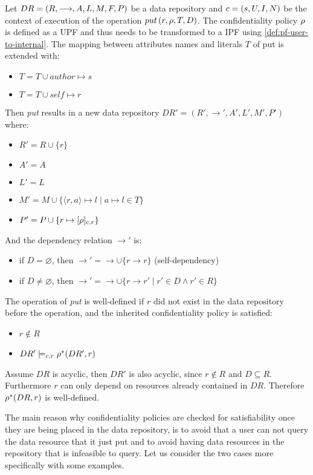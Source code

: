 \begin{definition}
Let $DR= \left( R, \longrightarrow, A, L, M, F, P \right)$ be a data repository and $c = \left( s, U, I, N \right)$ be the context of execution of the operation $put \left( r, \rho, T, D \right)$. The confidentiality policy $\rho$ is defined as a UPF and thus needs to be transformed to a IPF using \autoref{def:pf-user-to-internal}. The mapping between attributes names and literals $T$ of put is extended with: 
\begin{itemize}
    \item $T = T \cup author \mapsto s$
    \item $T = T \cup self \mapsto r$
\end{itemize}
Then \emph{put} results in a new data repository $DR'=\left(R', \longrightarrow', A', L', M', P' \right)$ where:
\begin{itemize}
    \item $R' = R \cup \{r\}$
    \item $A' = A$
    \item $L' = L$
    \item $M' = M \cup \{ \langle r,a \rangle \mapsto l \mid a \mapsto l \in T \}$
    \item $P' = P \cup \{ r \mapsto [\rho]_{c,r} \}$
\end{itemize}
And the dependency relation $\longrightarrow'$ is:
\begin{itemize}
    \item if $D = \varnothing$, then $\longrightarrow' = \longrightarrow \cup \{r \longrightarrow r\}$ (self-dependency)
    \item if $D \neq \varnothing$, then $\longrightarrow' = \longrightarrow \cup \{r \longrightarrow r' \mid r' \in D \land r' \in R \}$
\end{itemize}
The operation of \emph{put} is well-defined if $r$ did not exist in the data repository before the operation, and the inherited confidentiality policy is satisfied:
\begin{itemize}
    \item $r \not\in R$
    \item $DR' \models_{c,r} \rho^{\ast}(DR',r)$
\end{itemize}
Assume $DR$ is acyclic, then $DR'$ is also acyclic, since $r \notin R$ and $D \subseteq R$. Furthermore $r$ can only depend on resources already contained in $DR$. Therefore $\rho^{\ast}(DR,r)$ is well-defined.
\end{definition}

The main reason why confidentiality policies are checked for satisfiability once they are being placed in the data repository, is to avoid that a user can not query the data resource that it just put and to avoid having data resources in the repository that is infeasible to query. Let us consider the two cases more specifically with some examples.

